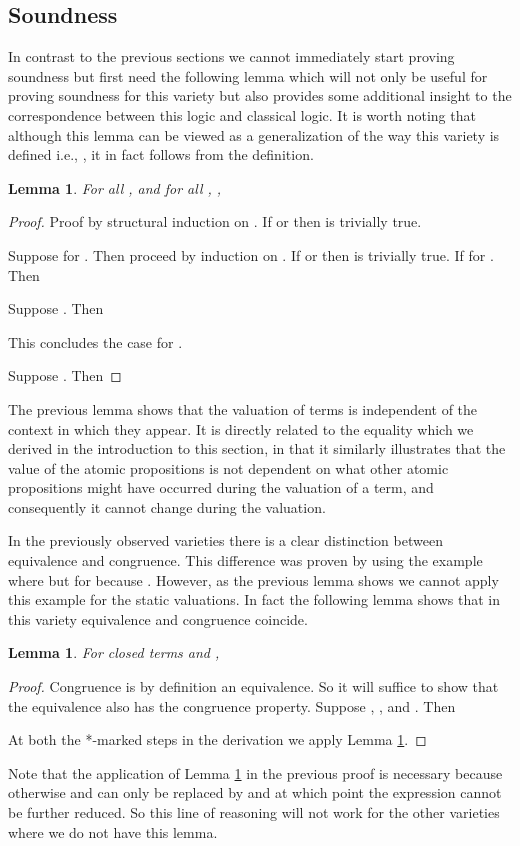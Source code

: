 \documentclass[a4paper,twoside,openright]{report}
\newtheorem{lem}[theorem]{Lemma}
\begin{document}
\subsection{Soundness}
In contrast to the previous sections we cannot immediately start proving soundness but first need the following lemma which will not only be useful for proving soundness for this variety but also provides some additional insight to the correspondence between this logic and classical logic. It is worth noting that although this lemma can be viewed as a generalization of the way this variety is defined i.e., , it in fact follows from the definition.
\begin{lem}\label{static gen lemma}
For all ,  and for all , ,

\end{lem}
\begin{proof}
Proof by structural induction on . If  or  then  is trivially true. 

Suppose  for . Then proceed by induction on . If  or  then  is trivially true. If  for . Then

Suppose . Then

This concludes the case for .

Suppose . Then

\end{proof}
The previous lemma shows that the valuation of terms is independent of the context in which they appear. It is directly related to the equality  which we derived in the introduction to this section, in that it similarly illustrates that the value of the atomic propositions is not dependent on what other atomic propositions might have occurred during the valuation of a term, and consequently it cannot change during the valuation.

In the previously observed varieties there is a clear distinction between equivalence and congruence. This difference was proven by using the example where  but  for  because . However, as the previous lemma shows we cannot apply this example for the static valuations. In fact the following lemma shows that in this variety equivalence and congruence coincide.
\begin{lem}\label{equiv congr lem}
For closed terms  and ,

\end{lem}
\begin{proof}
Congruence is by definition an equivalence. So it will suffice to show that the equivalence  also has the congruence property. Suppose , , and . Then

At both the *-marked steps in the derivation we apply Lemma \ref{static gen lemma}.
\end{proof}
Note that the application of Lemma \ref{static gen lemma} in the previous proof is necessary because otherwise  and  can only be replaced by  and  at which point the expression cannot be further reduced. So this line of reasoning will not work for the other varieties where we do not have this lemma. 
\end{document}
